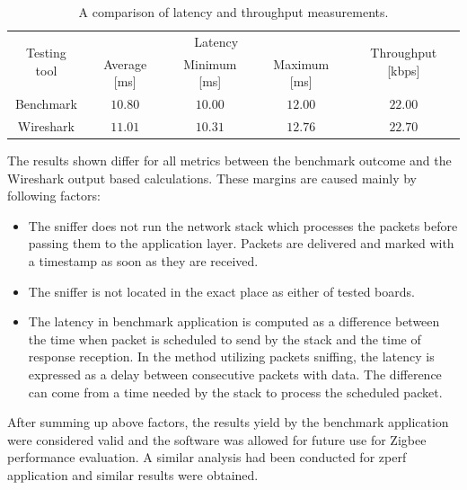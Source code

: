 \begin{table}[H]
\centering
\begin{tabular}{|c|c|c|c|c|}
\hline
\multirow{2}{*}{Testing tool} & \multicolumn{3}{c|}{Latency} & \multirow{2}{*}{Throughput [kbps]}  \\\cline{2-4}

                  & Average [ms] & Minimum [ms] & Maximum [ms]               &                   \\
\hline
Benchmark & $ 10.80 $  & $ 10.00 $ & $ 12.00 $   &      $22.00$              \\
\hline
Wireshark &  $11.01$ & $10.31$ & $12.76$      &      $22.70$  \\
\hline
\end{tabular}
\caption{A comparison of latency and throughput measurements.}
\label{table:verification}
\end{table}

The results shown differ for all metrics between the benchmark outcome and the 
Wireshark output based calculations. These margins are caused mainly by 
following factors:

\begin{itemize}
    \itemsep0em
    \item The sniffer does not run the network stack which processes the packets before passing them to the application layer. Packets are delivered and marked with a timestamp as soon as they are received.
    \item The sniffer is not located in the exact place as either of tested boards.
    \item The latency in benchmark application is computed as a difference between the time when packet is scheduled to send by the stack and the time
    of response reception. In the method utilizing packets sniffing, the latency
    is expressed as a delay between consecutive packets with data. The difference can come from a time needed by the stack to process the scheduled packet.
\end{itemize}

After summing up above factors, the results yield by the benchmark application
were considered valid and the software was allowed for future use for Zigbee 
performance evaluation. A similar analysis had been conducted for zperf 
application and similar results were obtained. 
